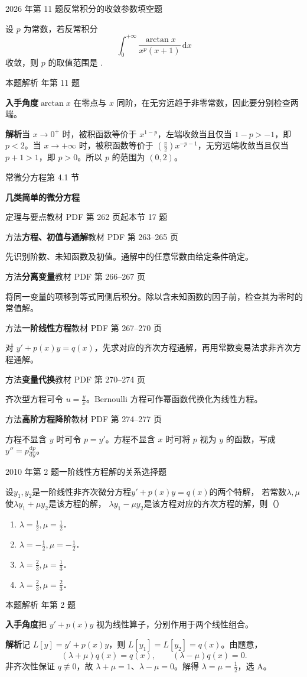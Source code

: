 \documentclass[UTF8,zihao=-4,fontset=fandol]{ctexart}
\newcommand{\SectionHeading}[4]{%
  \clearpage\hypertarget{sec-#1}{}%
  {\small\textcolor{accent}{#2\hfill 第 #1 节}}\par\medskip
  {\LARGE\bfseries #3}\par\smallskip
  {\small\textcolor{muted}{#4}}\par\bigskip}
\newcommand{\Theory}[4]{%
  {\small\textcolor{accent}{#1}\quad\textbf{#3}\hfill\textcolor{muted}{教材 PDF 第 #2 页}}\par
  {\small #4}\par\smallskip}
\newcommand{\blank}{\underline{\hspace{5em}}}
\newcommand{\pickout}{\hfill（\hspace{1.4em}）}
\newenvironment{abcd}{\begin{enumerate}[label=\textup{(\Alph*)},leftmargin=2.3em,itemsep=1pt,topsep=4pt,parsep=1pt]}{\end{enumerate}}
\newcommand{\QuestionPage}[6]{%
  \par\noindent\begin{minipage}{\linewidth}
  \raggedright
  {\small\textcolor{black!60}{#3\quad #5}\hfill\textcolor{accent}{#2}}\par\smallskip}
\newcommand{\QuestionEnd}{\end{minipage}\par\medskip}
\newcommand{\QuestionPage}[6]{%
  \clearpage
  {\small\textcolor{accent}{#1\hfill #2}}\par\medskip
  {\small\textcolor{black!60}{#3\quad #5\hfill #6}}\par\vspace{9bp}}
\newcommand{\QuestionEnd}{}
\newenvironment{QuestionSolution}[1]{%
  \clearpage
  {\small\textcolor{black!60}{本题解析\quad #1}}\par\medskip
}{\par\clearpage}
\begin{document}
\QuestionPage{3.5 反常积分}{填空题}{2026 年第 11 题}{2}{反常积分的收敛参数}{201 / 234}
设 \(p\) 为常数，若反常积分
\[\int_0^{+\infty}\frac{\arctan x}{x^p(x+1)}\,\mathrm{d}x
\]
收敛，则 \(p\) 的取值范围是 \blank{}.
\QuestionEnd

\begin{QuestionSolution}{2026 年第 11 题}
\textbf{入手角度}\quad \(\arctan x\) 在零点与 \(x\) 同阶，在无穷远趋于非零常数，因此要分别检查两端。

\textbf{解析}\quad 当 \(x\to0^+\) 时，被积函数等价于 \(x^{1-p}\)，左端收敛当且仅当 \(1-p>-1\)，即 \(p<2\)。当 \(x\to+\infty\) 时，被积函数等价于 \((\frac{\pi}{2})x^{-p-1}\)，无穷远端收敛当且仅当 \(p+1>1\)，即 \(p>0\)。所以 \(p\) 的范围为 \(\boxed{(0,2)}\)。
\end{QuestionSolution}

\SectionHeading{4.1}{常微分方程}{几类简单的微分方程}{定理与要点\quad 教材 PDF 第 262 页起\hfill 本节 17 题}
\Theory{方法}{263--265}{方程、初值与通解}{先识别阶数、未知函数及初值。通解中的任意常数由给定条件确定。}
\Theory{方法}{266--267}{分离变量}{将同一变量的项移到等式同侧后积分。除以含未知函数的因子前，检查其为零时的常值解。}
\Theory{方法}{267--270}{一阶线性方程}{对 \(y'+p(x)y=q(x)\)，先求对应的齐次方程通解，再用常数变易法求非齐次方程通解。}
\Theory{方法}{270--274}{变量代换}{齐次型方程可令 \(u=\frac{y}{x}\)。Bernoulli 方程可作幂函数代换化为线性方程。}
\Theory{方法}{274--277}{高阶方程降阶}{方程不显含 \(y\) 时可令 \(p=y'\)。方程不显含 \(x\) 时可将 \(p\) 视为 \(y\) 的函数，写成 \(y''=p\frac{\mathrm{d}p}{\mathrm{d}y}\)。}
\QuestionPage{4.1 几类简单的微分方程}{选择题}{2010 年第 2 题}{1}{一阶线性方程解的关系}{202 / 234}
设$y_1,y_2$是一阶线性非齐次微分方程$y' + p(x)y = q(x)$的两个特解，
若常数$\lambda ,\mu$使$\lambda y_1 + \mu y_2$是该方程的解，
$\lambda y_1 - \mu y_2$是该方程对应的齐次方程的解，则\pickout{}
\begin{abcd}
\item $\lambda = \frac{1}{2},\mu = \frac{1}{2}$．
\item $\lambda = - \frac{1}{2},\mu = - \frac{1}{2}$．
\item $\lambda = \frac{2}{3},\mu = \frac{1}{3}$．
\item $\lambda = \frac{2}{3},\mu = \frac{2}{3}$．
\end{abcd}
\QuestionEnd

\begin{QuestionSolution}{2010 年第 2 题}
\textbf{入手角度}\quad 把 \(y'+p(x)y\) 视为线性算子，分别作用于两个线性组合。

\textbf{解析}\quad 记 \(L[y]=y'+p(x)y\)，则 \(L[y_1]=L[y_2]=q(x)\)。由题意，
\[
(\lambda+\mu)q(x)=q(x),\qquad(\lambda-\mu)q(x)=0.
\]
非齐次性保证 \(q\not\equiv0\)，故 \(\lambda+\mu=1\)、\(\lambda-\mu=0\)。解得 \(\lambda=\mu=\frac{1}{2}\)，选 A。
\end{QuestionSolution}
\end{document}
